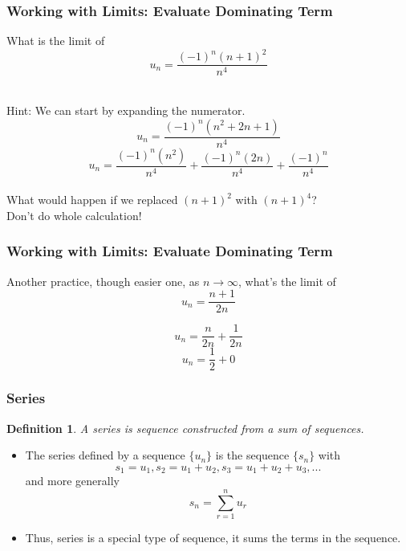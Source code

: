 \documentclass[handout]{beamer}
\newtheorem{defn}{Definition}
\numberwithin{equation}{section}
\begin{document}







\begin{frame}
\frametitle{Working with Limits: Evaluate Dominating Term}

What is the limit of 
$$ u_{n} = \frac{(-1)^n (n+1)^2}{n^4} $$

\ \\Hint: We can start by expanding the numerator. \pause
$$ u_{n} = \frac{(-1)^n (n^2+2n+1)}{n^4} $$\pause
$$ u_{n} = \frac{(-1)^n (n^2)}{n^4}+\frac{(-1)^n (2n)}{n^4}+\frac{(-1)^n}{n^4} $$\pause
\ \\What would happen if we replaced $(n+1)^2$ with $(n+1)^4$?  \\Don't do whole calculation! \pause
\end{frame}






\begin{frame}
\frametitle{Working with Limits: Evaluate Dominating Term}
Another practice, though easier one, as $n\rightarrow \infty$, what's the limit of 
$$ u_{n} = {\frac{n+1}{2n}} $$\pause

$$ u_{n} = \frac{n}{2n}+\frac{1}{2n} $$\pause
$$ u_{n} = \frac{1}{2}+0 $$


\end{frame}



\begin{frame}
\frametitle{Series}
\begin{defn}
A \alert{series} is sequence constructed from a sum of sequences.
\end{defn} \pause
\begin{itemize}
\item The series defined by a sequence $\{u_n\}$ is the sequence $\{s_n\}$ with $$s_1=u_1, s_2=u_1+u_2, s_3=u_1+u_2+u_3, ...$$ and more generally $$s_n=\sum_{r=1}^{n}u_r$$ \pause

\item Thus, series is a special type of sequence, it sums the terms in the sequence.
\end{itemize}

\end{frame}
\end{document}
